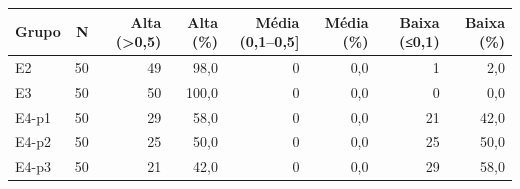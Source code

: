\begin{tabular}{lrrrrrrr}
\toprule
Grupo & N & Alta (>0,5) & Alta (\%) & Média (0,1–0,5] & Média (\%) & Baixa (≤0,1) & Baixa (\%) \\
\midrule
E2 & 50 & 49 & 98,0 & 0 & 0,0 & 1 & 2,0 \\
E3 & 50 & 50 & 100,0 & 0 & 0,0 & 0 & 0,0 \\
E4-p1 & 50 & 29 & 58,0 & 0 & 0,0 & 21 & 42,0 \\
E4-p2 & 50 & 25 & 50,0 & 0 & 0,0 & 25 & 50,0 \\
E4-p3 & 50 & 21 & 42,0 & 0 & 0,0 & 29 & 58,0 \\
\bottomrule
\end{tabular}
